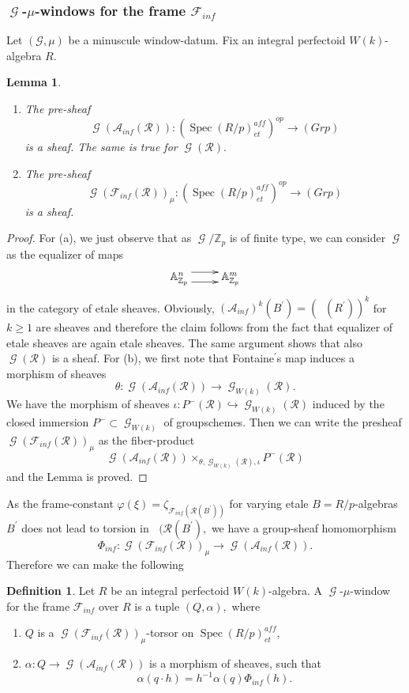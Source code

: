 \documentclass[a4paper,10,5 pt]{amsart}
\newtheorem{Lemma}[Satz]{Lemma}
\theoremstyle{definition}
\newtheorem{Definition}{Definition}
\DeclareMathOperator{\Spec}{Spec}
\DeclareMathOperator{\Ainf}{\mathbb{A}_{inf}}
\DeclareMathOperator{\G}{\mathcal{G}}
\begin{document}
\subsubsection{$\G$-$\mu$-windows for the frame $\mathcal{F}_{inf}$}
Let $(\mathcal{G},\mu)$ be a minuscule window-datum. Fix an integral perfectoid $W(k)$-algebra $R.$
\begin{Lemma}
\begin{enumerate}
\item[(a):] The pre-sheaf
$$\G(\mathcal{A}_{inf}(\mathcal{R}))\colon (\Spec(R/p)^{aff}_{et})^{op}\rightarrow (Grp)$$ is a sheaf. The same is true for $\G(\mathcal{R}).$
\item[(b):] The pre-sheaf
$$\G(\mathcal{F}_{inf}(\mathcal{R}))_{\mu}\colon (\Spec(R/p)^{aff}_{et})^{op}\rightarrow (Grp)$$ is a sheaf.
\end{enumerate}
\end{Lemma}
\begin{proof}
For (a), we just observe that as $\G/\mathbb{Z}_{p}$ is of finite type, we can consider $\G$ as the equalizer of maps 
$$
\xymatrix{
\mathbb{A}^{n}_{\mathbb{Z}_{p}} \ar@<1ex>[r] \ar@<-1ex>[r] & \mathbb{A}^{m}_{\mathbb{Z}_{p}}
}
$$
in the category of etale sheaves. Obviously, $(\mathcal{A}_{inf})^{k}(B^{\prime})=(\Ainf(R^{\prime}))^{k}$ for $k\geq 1$ are sheaves and therefore the claim follows from the fact that equalizer of etale sheaves are again etale sheaves. The same argument shows that also $\G(\mathcal{R})$ is a sheaf. For (b), we first note that Fontaine$^{\prime}$s map induces a morphism of sheaves
$$\theta\colon \G(\mathcal{A}_{inf}(\mathcal{R})) \rightarrow \G_{W(k)}(\mathcal{R}).$$
We have the morphism of sheaves $\iota\colon P^{-}(\mathcal{R})\hookrightarrow \G_{W(k)}(\mathcal{R})$ induced by the closed immersion $P^{-}\subset \G_{W(k)}$ of groupschemes. Then we can write the presheaf $\G(\mathcal{F}_{inf}(\mathcal{R}))_{\mu}$ as the fiber-product
$$\G(\mathcal{A}_{inf}(\mathcal{R})) \times_{\theta,\G_{W(k)}(\mathcal{R}),\iota} P^{-}(\mathcal{R})$$ and the Lemma is proved.
\end{proof}
As the frame-constant $\varphi(\xi)=\zeta_{\mathcal{F}_{inf}(\mathcal{R}(B^{\prime}))}$ for varying etale $B=R/p$-algebras $B^{\prime}$ does not lead to torsion in $\Ainf(\mathcal{R}(B^{\prime}),$ we have a group-sheaf homomorphism
$$\Phi_{inf}\colon \G(\mathcal{F}_{inf}(\mathcal{R}))_{\mu} \rightarrow \G(\mathcal{A}_{inf}(\mathcal{R})).$$
Therefore we can make the following
\begin{Definition}\label{Definition von Windows fuer Ainf}
Let $R$ be an integral perfectoid $W(k)$-algebra. A $\G$-$\mu$-window for the frame $\mathcal{F}_{inf}$ over $R$ is a tuple $(Q,\alpha),$
where
\begin{enumerate}
\item[(a):] $Q$ is a $\G(\mathcal{F}_{inf}(\mathcal{R}))_{\mu}$-torsor on $\Spec(R/p)_{et}^{aff}$,
\item[(b):] $\alpha\colon Q\rightarrow \G(\mathcal{A}_{inf}(\mathcal{R}))$ is a morphism of sheaves, such that
$$\alpha(q\cdot h)=h^{-1}\alpha(q)\Phi_{inf}(h).$$
\end{enumerate}
\end{Definition}
\end{document}
